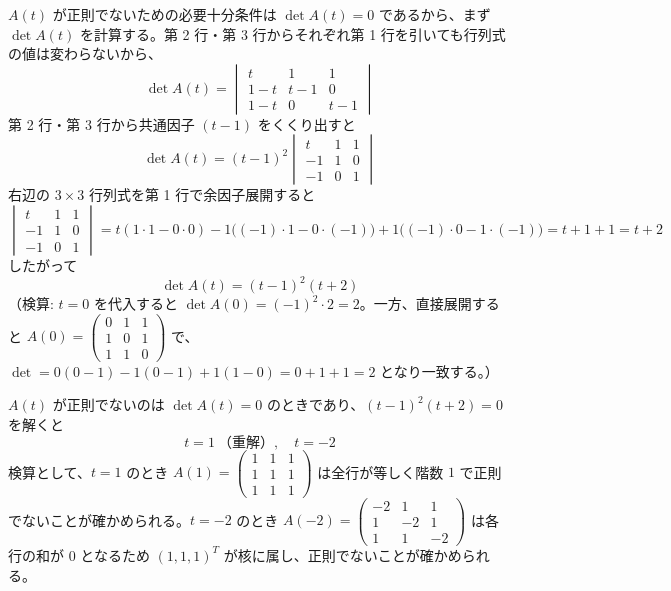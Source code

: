 
$A(t)$ が正則でないための必要十分条件は $\det A(t) = 0$ であるから、まず $\det A(t)$ を計算する。第 2 行・第 3 行からそれぞれ第 1 行を引いても行列式の値は変わらないから、
\[
\det A(t) =
\begin{vmatrix}
t & 1 & 1 \\
1-t & t-1 & 0 \\
1-t & 0 & t-1
\end{vmatrix}
\]
第 2 行・第 3 行から共通因子 $(t-1)$ をくくり出すと
\[
\det A(t) = (t-1)^{2}
\begin{vmatrix}
t & 1 & 1 \\
-1 & 1 & 0 \\
-1 & 0 & 1
\end{vmatrix}
\]
右辺の $3\times3$ 行列式を第 1 行で余因子展開すると
\[
\begin{vmatrix}
t & 1 & 1 \\
-1 & 1 & 0 \\
-1 & 0 & 1
\end{vmatrix}
= t(1\cdot1 - 0\cdot0) - 1\bigl((-1)\cdot1 - 0\cdot(-1)\bigr) + 1\bigl((-1)\cdot0 - 1\cdot(-1)\bigr)
= t + 1 + 1 = t+2
\]
したがって
\[
\det A(t) = (t-1)^{2}(t+2)
\]
（検算: $t=0$ を代入すると $\det A(0) = (-1)^2\cdot 2 = 2$。一方、直接展開すると $A(0)=\begin{pmatrix}0&1&1\\1&0&1\\1&1&0\end{pmatrix}$ で、$\det = 0(0-1)-1(0-1)+1(1-0)=0+1+1=2$ となり一致する。）

$A(t)$ が正則でないのは $\det A(t) = 0$ のときであり、$(t-1)^{2}(t+2)=0$ を解くと
\[
\boxed{\; t = 1 \ \text{（重解）}, \quad t = -2 \;}
\]
検算として、$t=1$ のとき $A(1)=\begin{pmatrix}1&1&1\\1&1&1\\1&1&1\end{pmatrix}$ は全行が等しく階数 $1$ で正則でないことが確かめられる。$t=-2$ のとき $A(-2)=\begin{pmatrix}-2&1&1\\1&-2&1\\1&1&-2\end{pmatrix}$ は各行の和が $0$ となるため $(1,1,1)^{T}$ が核に属し、正則でないことが確かめられる。
